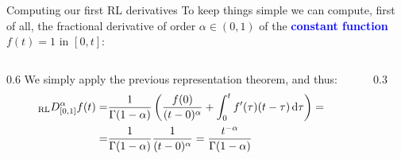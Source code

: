 \documentclass[aspectratio=169,xcolor=dvipsnames]{beamer}
\begin{document}
\begin{frame}{Computing our first RL derivatives}
To keep things simple we can compute, first of all, the fractional derivative of order $\alpha \in (0,1)$ of the \textcolor{blue}{\textbf{constant function}} $f(t) = 1$ in $[0,t]$:

\begin{columns}
\begin{column}{0.6\columnwidth}
We simply apply the previous representation theorem, and thus:
\[
\begin{split}
{}_\text{RL}D_{[0,1]}^\alpha f(t) = & \frac{1}{\Gamma(1-\alpha)} \left( \frac{f(0)}{(t-0)^\alpha} + \int_{0}^{t} f'(\tau)(t-\tau)\,{\rm d}\tau \right) = \\
= & \frac{1}{\Gamma(1-\alpha)} \frac{1}{(t-0)^\alpha} = \frac{t^{-\alpha}}{\Gamma(1-\alpha)}
\end{split}
\]
\end{column}
\begin{column}{0.3\columnwidth}

\end{column}
\end{columns}
\vfill


\end{frame}
\end{document}
